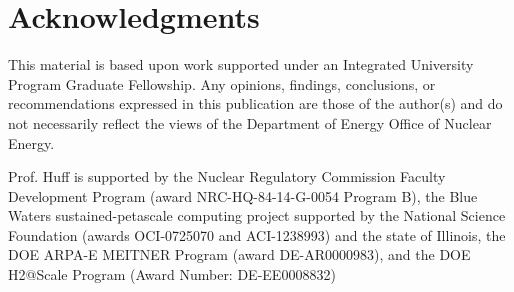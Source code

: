 \documentclass[12pt, letterpaper]{article}
\renewcommand *\footnoterule{}
\begin{document}
\section*{Acknowledgments}
This material is based upon work supported under an Integrated University 
Program Graduate Fellowship. Any opinions, findings, conclusions, or 
recommendations expressed in this publication are those of the author(s) 
and do not necessarily reflect the views of the Department of Energy Office 
of Nuclear Energy.

Prof. Huff is supported by the Nuclear Regulatory Commission Faculty
Development Program (award NRC-HQ-84-14-G-0054 Program B), the Blue Waters
sustained-petascale computing project supported by the National Science
Foundation (awards OCI-0725070 and ACI-1238993) and the state of Illinois, the
DOE ARPA-E MEITNER Program (award DE-AR0000983), and the DOE H2@Scale Program
(Award Number: DE-EE0008832)




\end{document}
